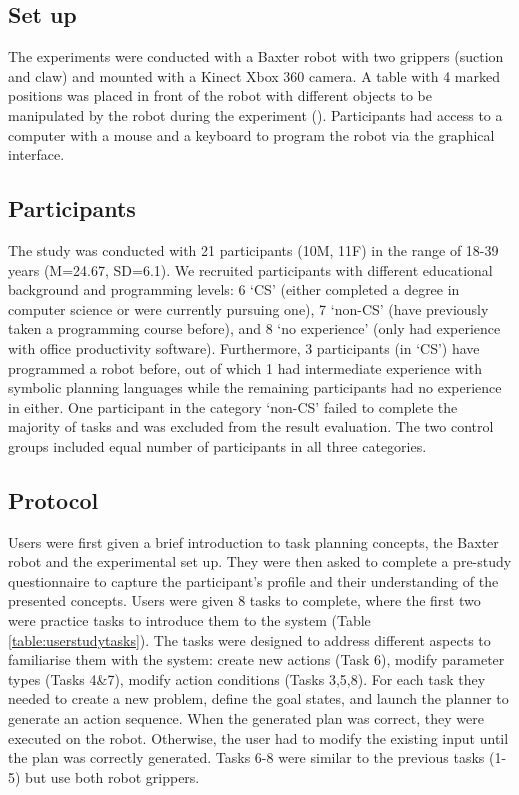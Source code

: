 \subsection{Set up}
The experiments were conducted with a Baxter robot with two grippers (suction and claw) and mounted with a Kinect Xbox 360 camera. 
A table with 4 marked positions was placed in front of the robot with different objects to be manipulated by the robot during the experiment ().
Participants had access to a computer with a mouse and a keyboard to program the robot via the graphical interface.

\subsection{Participants}\label{exp3-participants}
The study was conducted with 21 participants (10M, 11F) in the range of 18-39 years (M=24.67, SD=6.1).
We recruited participants with different educational background and programming levels: 
6 `CS' (either completed a degree in computer science or were currently pursuing one),
7 `non-CS' (have previously taken a programming course before), 
and 8 `no experience' (only had experience with office productivity software).
Furthermore, 3 participants (in `CS') have programmed a robot before, out of which 1 had intermediate experience with symbolic planning languages while the remaining participants had no experience in either.
One participant in the category `non-CS' failed to complete the majority of tasks and was excluded from the result evaluation.
The two control groups included equal number of participants in all three categories.

\subsection{Protocol}
Users were first given a brief introduction to task planning concepts, the Baxter robot and the experimental set up.
They were then asked to complete a pre-study questionnaire to capture the participant's profile and their understanding of the presented concepts.
Users were given 8 tasks to complete, where the first two were practice tasks to introduce them to the system (Table \ref{table:userstudytasks}). 
The tasks were designed to address different aspects to familiarise them with the system:
create new actions (Task 6), modify parameter types (Tasks 4\&7), modify action conditions (Tasks 3,5,8).
For each task they needed to create a new problem, define the goal states, and launch the planner to generate an action sequence.
When the generated plan was correct, they were executed on the robot.
Otherwise, the user had to modify the existing input until the plan was correctly generated.
Tasks 6-8 were similar to the previous tasks (1-5) but use both robot grippers.

